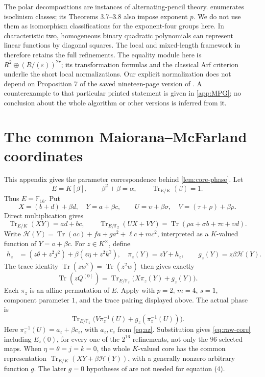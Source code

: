 \documentclass[11pt,a4paper]{article}
\theoremstyle{definition}
\theoremstyle{remark}
\numberwithin{equation}{section}
\newcommand{\F}{\mathbb F}
\newcommand{\Tr}{\operatorname{Tr}}
\newcommand{\eps}{\varepsilon}
\begin{document}
The polar decompositions are instances of alternating-pencil theory.
\citep[Theorem 1.2]{LM18} enumerates isoclinism classes; its
Theorems 3.7--3.8 also impose exponent \(p\). We do not use them as
isomorphism classifications for the exponent-four groups here.
In characteristic two, homogeneous binary quadratic polynomials can
represent linear functions by diagonal squares. The local and
mixed-length framework in \citep[Section 4, pp.~15--18]{PFMR14}
therefore retains the full refinements. The equality module here is
\(R^2\oplus(R/(\eps))^{2r}\); its transformation formulas and the
classical Arf criterion underlie the short local normalizations.
Our explicit normalization does not depend on Proposition 7 of the
saved nineteen-page version of \citep{MPG13}. A counterexample to that
particular printed statement is given in \cref{app:MPG}; no conclusion
about the whole algorithm or other versions is inferred from it.

\appendix
\section{The common Maiorana--McFarland coordinates}\label{app:MM}
This appendix gives the parameter correspondence behind
\cref{lem:core-phase}. Let
\[
 E=K[\beta],\qquad \beta^2+\beta=\alpha,
 \qquad\Tr_{E/K}(\beta)=1.
\]
Thus \(E=\F_{16}\). Put
\[
 X=(b+d)+\beta d,\quad Y=a+\beta c,\qquad
 U=\upsilon+\beta\sigma,\quad
 V=(\tau+\rho)+\beta\rho.
\]
Direct multiplication gives
\[
 \Tr_{E/K}(XY)=ad+bc,\qquad
 \Tr_{E/\F_2}(UX+VY)
 =\Tr(\rho a+\sigma b+\tau c+\upsilon d).
\]
Write \(\mathcal H(Y)=\Tr(ac)+fa+ga^2+\ell c+mc^2\), interpreted
as a \(K\)-valued function of \(Y=a+\beta c\). For \(z\in K^\times\),
define
\begin{align*}
 h_z&=(z\theta+z^2j^2)+\beta(z\eta+z^2k^2),\quad
 \pi_z(Y)=zY+h_z,\qquad g_z(Y)=z\beta\mathcal H(Y).
\end{align*}
The trace identity \(\Tr(zw^2)=\Tr(z^2w)\) then gives exactly
\[
 \Tr(zQ^{(0)})
 =\Tr_{E/\F_2}\bigl(X\pi_z(Y)+g_z(Y)\bigr).
\]
Each \(\pi_z\) is an affine permutation of \(E\). Apply
\citep[equation (4), p.~313]{CMP18} with \(p=2\), \(m=4\), \(s=1\),
component parameter \(1\), and the trace pairing displayed above.
The actual phase is
\[
 \Tr_{E/\F_2}\bigl(V\pi_z^{-1}(U)
                     +g_z(\pi_z^{-1}(U))\bigr).
\]
Here \(\pi_z^{-1}(U)=a_z+\beta c_z\), with \(a_z,c_z\) from
\eqref{eq:az}. Substitution gives \eqref{eq:raw-core} including
\(E_z(0)\), for every one of the \(2^{16}\) refinements, not only the
\(96\) selected maps. When \(\eta=\theta=j=k=0\), the whole
\(K\)-valued core has the common representation
\(\Tr_{E/K}(XY+\beta\mathcal H(Y))\), with a generally nonzero
arbitrary function \(g\). The later \(g=0\) hypotheses of
\citep[Theorem 2]{CMP18} are not needed for equation (4).
\end{document}

